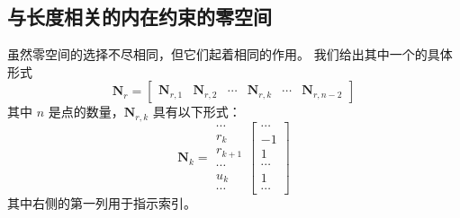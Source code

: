 \subsection{与长度相关的内在约束的零空间}\label{sec: nullspace_length_cons}
虽然零空间的选择不尽相同，但它们起着相同的作用。
我们给出其中一个的具体形式
\begin{equation}
  \mathbf{N}_r = \begin{bmatrix} \mathbf{N}_{r,1} & \mathbf{N}_{r,2} & \cdots & \mathbf{N}_{r,k} &\cdots &\mathbf{N}_{r, n-2} \end{bmatrix}
\end{equation}
其中 $n$ 是点的数量，$\mathbf{N}_{r,k}$ 具有以下形式：
\begin{equation}
\mathbf{N}_k = \begin{matrix}
\cdots\\
r_k\\
r_{k+1}\\
\cdots\\
u_k\\
\cdots
\end{matrix}\begin{bmatrix}
\cdots \\
-1 \\
1 \\
\cdots \\
1 \\
\cdots
\end{bmatrix}
\end{equation}
其中右侧的第一列用于指示索引。
\fi

